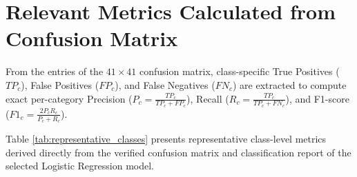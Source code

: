 \section{Relevant Metrics Calculated from Confusion Matrix}
\label{sec:metrics_from_confusion_matrix}

From the entries of the $41 \times 41$ confusion matrix, class-specific True Positives ($TP_c$), False Positives ($FP_c$), and False Negatives ($FN_c$) are extracted to compute exact per-category Precision ($P_c = \frac{TP_c}{TP_c + FP_c}$), Recall ($R_c = \frac{TP_c}{TP_c + FN_c}$), and F1-score ($F1_c = \frac{2 P_c R_c}{P_c + R_c}$).

Table \ref{tab:representative_classes} presents representative class-level metrics derived directly from the verified confusion matrix and classification report of the selected Logistic Regression model.

